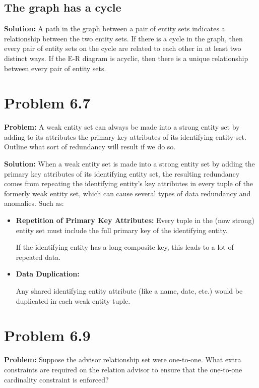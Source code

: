 \documentclass[12pt,a4paper]{article}
\begin{document}
\subsection*{The graph has a cycle}

\textbf{Solution:} A path in the graph between a pair of entity sets indicates a relationship between the two entity sets. If there is a cycle in the graph, then every pair of entity sets on the cycle are related to each other in at least two distinct ways. If the E-R diagram is acyclic, then there is a unique relationship between every pair of entity sets.

\section*{Problem 6.7}

\textbf{Problem:} A weak entity set can always be made into a strong entity set by adding to its attributes the primary-key attributes of its identifying entity set. Outline what sort of redundancy will result if we do so.

\textbf{Solution:} When a weak entity set is made into a strong entity set by adding the primary key attributes of its identifying entity set, the resulting redundancy comes from repeating the identifying entity’s key attributes in every tuple of the formerly weak entity set, which can cause several types of data redundancy and anomalies. Such as: 
\begin{itemize}
\item 
\textbf{Repetition of Primary Key Attributes:} Every tuple in the (now strong) entity set must include the full primary key of the identifying entity.

If the identifying entity has a long composite key, this leads to a lot of repeated data.

\item \textbf{Data Duplication:}

Any shared identifying entity attribute (like a name, date, etc.) would be duplicated in each weak entity tuple.
\end{itemize}
\section*{Problem 6.9}

\textbf{Problem:} Suppose the advisor relationship set were one-to-one. What extra constraints are required on the relation advisor to ensure that the one-to-one cardinality constraint is enforced?
\end{document}
